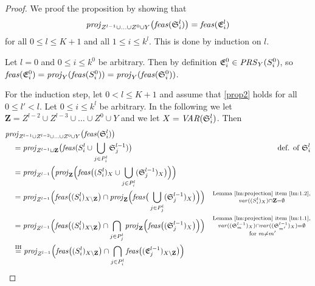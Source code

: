 \proptre*
\begin{proof}
We proof the proposition by showing that 
\begin{equation}\label{prop2}
\mathit{proj}_{Z^{l-1}\cup \ldots \cup Z^0\cup Y}\big(\mathit{feas}(\mathfrak{S}^l_i)\big)=\mathit{feas}(\mathfrak{E}^l_i)
\end{equation}
for all $0 \leq l \leq K+1$ and all $1\leq i \leq k^l$.
This is done by induction on $l$.

Let $l = 0$ and $0\leq i \leq k^0$ be arbitrary. Then by definition $\mathfrak{E}^0_i\in\mathit{PRS}_Y(S^0_i)$, so $\mathit{feas}(\mathfrak{E}^0_i)=\mathit{proj}_Y(\mathit{feas}(S^0_i))=\mathit{proj}_Y(\mathit{feas}(\mathfrak{S}^0_i))$.

For the induction step, let $0< l \leq K+1$ and assume that \eqref{prop2} holds for all $0\leq l'<l$.
Let $0\leq i\leq k^l$ be arbitrary. In the following we let $\mathbf{Z} = Z^{l-2} \cup Z^{l-3}\cup\ldots \cup Z^0\cup Y$ and we let $X=\mathit{VAR}(\mathfrak{S}^l_i)$. Then
\begin{align*}
&\proj_{Z^{l-1}\cup Z^{l-2}\cup\ldots\cup Z^0\cup Y}\big(\feas(\mathfrak{S}^l_i)\big)&\\ 
&\quad=\proj_{Z^{l-1}\cup\mathbf{Z}}\big(\feas(S^l_i\cup\bigcup_{j\in P^l_i}\mathfrak{S}^{l-1}_j)\big) & \text{def. of }\mathfrak{S}^l_i\\
&\quad= \proj_{Z^{l-1}}\Big(\proj_{\mathbf{Z}}\Big(\feas\big((S^l_i)_X\cup\bigcup_{j\in P^l_i}(\mathfrak{S}^{l-1}_j)_X\big)\Big)\Big)\\
&\quad=\proj_{Z^{l-1}}\Big(\feas\big((S^l_i)_{X\setminus\mathbf{Z}}\big)\cap\proj_{\mathbf{Z}}\Big(\feas\big(\bigcup_{j\in P^l_j}(\mathfrak{S}^{l-1}_j)_X\big)\Big)\Big)
&\substack{\text{Lemma~\ref{lm:projection} item \ref{lm:1.2}},\\\var((S^l_i)_X)\cap \mathbf{Z}= \emptyset}\\ 
&\quad= \proj_{Z^{l-1}}\Big(\feas\big((S^l_i)_{X\setminus\mathbf{Z}}\big)\cap\bigcap_{j\in P^l_j}\proj_{\mathbf{Z}}\Big(\feas\big((\mathfrak{S}^{l-1}_j)_X\big)\Big)\Big)
&\substack{\text{Lemma~\ref{lm:projection} item \ref{lm:1.1}},\\\var((\mathfrak{S}^{l-1}_{m})_X)\cap\var((\mathfrak{S}^{l-1}_{m'})_X)=\emptyset\\\text{ for } m\neq m'}\\
&\quad \overset{\text{IH}}= \proj_{Z^{l-1}}\Big(\feas\big((S^l_i)_{X\setminus\mathbf{Z}}\big)\cap\bigcap_{j\in P^l_i}\feas\big((\mathfrak{E}^{l-1}_j)_{X\setminus \mathbf{Z}}\big)\Big)

\end{align*}
\end{proof}
